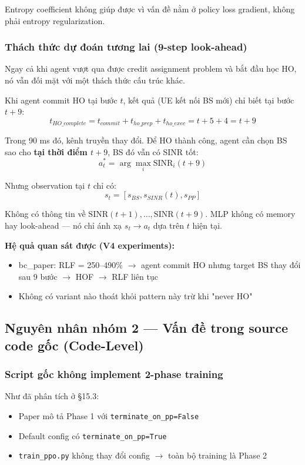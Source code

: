 \documentclass[11pt]{article}
\begin{document}
Entropy coefficient không giúp được vì vấn đề nằm ở policy loss gradient, không phải entropy regularization.

\subsubsection{Thách thức dự đoán tương lai (9-step look-ahead)}

Ngay cả khi agent vượt qua được credit assignment problem và bắt đầu học HO, nó vẫn đối mặt với một thách thức cấu trúc khác.

Khi agent commit HO tại bước $t$, kết quả (UE kết nối BS mới) chỉ biết tại bước $t+9$:
\[
t_{HO\_complete} = t_{commit} + t_{ho\_prep} + t_{ho\_exec} = t + 5 + 4 = t + 9
\]

Trong 90 ms đó, kênh truyền thay đổi. Để HO thành công, agent cần chọn BS sao cho \textbf{tại thời điểm $t+9$}, BS đó vẫn có SINR tốt:
\[
a_t^* = \arg\max_i \text{SINR}_i(t+9)
\]

Nhưng observation tại $t$ chỉ có:
\[
s_t = [s_{BS}, s_{SINR}(t), s_{PP}]
\]

Không có thông tin về $\text{SINR}(t+1), \ldots, \text{SINR}(t+9)$. MLP không có memory hay look-ahead --- nó chỉ ánh xạ $s_t \to a_t$ dựa trên $t$ hiện tại.

\textbf{Hệ quả quan sát được (V4 experiments):}
\begin{itemize}
  \item bc\_paper: RLF = 250--490\% $\to$ agent commit HO nhưng target BS thay đổi sau 9 bước $\to$ HOF $\to$ RLF liên tục
  \item Không có variant nào thoát khỏi pattern này trừ khi "never HO"
\end{itemize}

\subsection{Nguyên nhân nhóm 2 --- Vấn đề trong source code gốc (Code-Level)}

\subsubsection{Script gốc không implement 2-phase training}

Như đã phân tích ở \S15.3:
\begin{itemize}
  \item Paper mô tả Phase 1 với \texttt{terminate\_on\_pp=False}
  \item Default config có \texttt{terminate\_on\_pp=True}
  \item \texttt{train\_ppo.py} không thay đổi config $\to$ toàn bộ training là Phase 2
\end{itemize}
\end{document}
